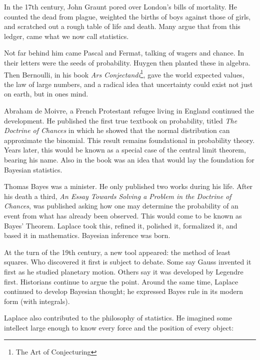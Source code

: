 In the 17th century, John Graunt pored over London's bills of mortality.  
He counted the dead from plague, weighted the births of boys against those of girls, and scratched out a rough table of life and death\cite{glass_john_1964}.  
Many argue that from this ledger, came what we now call statistics.  

Not far behind him came Pascal and Fermat, talking of wagers and chance.  
In their letters were the seeds of probability\cite{fienberg_review_1992}.  
Huygen then planted these in algebra.  Then Bernoulli, in his book \emph{Ars Conjectandi}\footnote{The Art of Conjecturing}, gave the world expected values, the law of large numbers, and a radical idea that uncertainty could exist not just on earth, but in ones mind.  

Abraham de Moivre, a French Protestant refugee living in England continued the development.  
He published the first true textbook on probability, titled \emph{The Doctrine of Chances} in which he showed that the normal distribution can approximate the binomial\cite{fienberg_review_1992}.    
This result remains foundational in probability theory.  
Years later, this would be known as a special case of the central limit theorem, bearing his name.  
Also in the book was an idea that would lay the foundation for Bayesian statistics.  

Thomas Bayes was a minister.  
He only published two works during his life.  
After his death a third, \emph{An Essay Towards Solving a Problem in the Doctrine of Chances}, was published asking how one may determine the probability of an event from what has already been observed.  
This would come to be known as Bayes' Theorem.  Laplace took this, refined it, polished it, formalized it, and based it in mathematics.  
Bayesian inference was born.  

At the turn of the 19th century, a new tool appeared: the method of least squares.  
Who discovered it first is subject to debate.  
Some say Gauss invented it first as he studied planetary motion.  
Others say it was developed by Legendre first.  
Historians continue to argue the point\cite{plackett_studies_1972}\cite{stigler_history_1986}.
Around the same time, Laplace continued to develop Bayesian thought; he expressed Bayes rule in its modern form (with integrals).  

Laplace also contributed to the philosophy of statistics.  
He imagined some intellect large enough to know every force and the position of every object:

